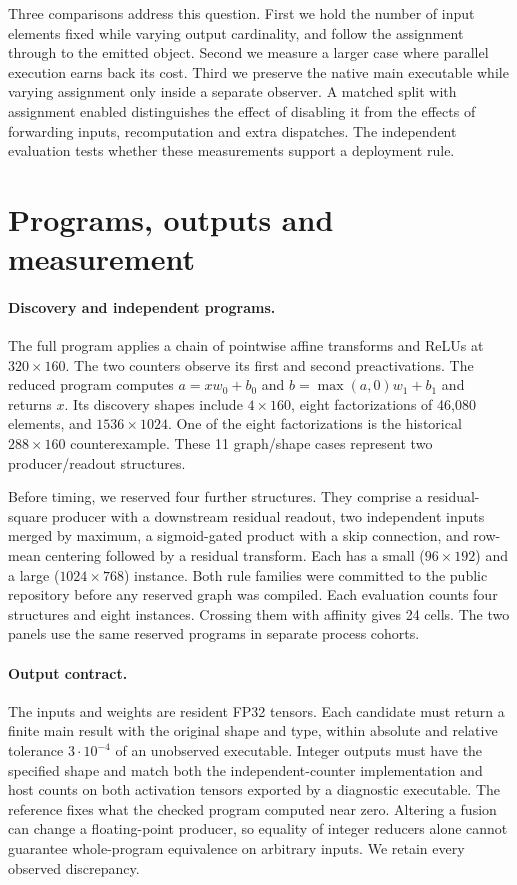 \documentclass[sigplan,10pt,review,anonymous,nonacm]{acmart}
\begin{document}
Three comparisons address this question. First we hold the number of input elements fixed while varying output cardinality, and follow the assignment through to the emitted object. Second we measure a larger case where parallel execution earns back its cost. Third we preserve the native main executable while varying assignment only inside a separate observer. A matched split with assignment enabled distinguishes the effect of disabling it from the effects of forwarding inputs, recomputation and extra dispatches. The independent evaluation tests whether these measurements support a deployment rule.

\section{Programs, outputs and measurement}
\paragraph{Discovery and independent programs.}
The full program applies a chain of pointwise affine transforms and ReLUs at $320\times160$. The two counters observe its first and second preactivations. The reduced program computes $a=xw_0+b_0$ and $b=\max(a,0)w_1+b_1$ and returns $x$. Its discovery shapes include $4\times160$, eight factorizations of 46,080 elements, and $1536\times1024$. One of the eight factorizations is the historical $288\times160$ counterexample. These 11 graph/shape cases represent two producer/readout structures.

Before timing, we reserved four further structures. They comprise a residual-square producer with a downstream residual readout, two independent inputs merged by maximum, a sigmoid-gated product with a skip connection, and row-mean centering followed by a residual transform. Each has a small ($96\times192$) and a large ($1024\times768$) instance. Both rule families were committed to the public repository before any reserved graph was compiled. Each evaluation counts four structures and eight instances. Crossing them with affinity gives 24 cells. The two panels use the same reserved programs in separate process cohorts.

\paragraph{Output contract.}
The inputs and weights are resident FP32 tensors. Each candidate must return a finite main result with the original shape and type, within absolute and relative tolerance $3\cdot10^{-4}$ of an unobserved executable. Integer outputs must have the specified shape and match both the independent-counter implementation and host counts on both activation tensors exported by a diagnostic executable. The reference fixes what the checked program computed near zero. Altering a fusion can change a floating-point producer, so equality of integer reducers alone cannot guarantee whole-program equivalence on arbitrary inputs. We retain every observed discrepancy.
\end{document}
